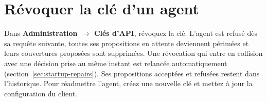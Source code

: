 \section{Révoquer la clé d'un agent}
\label{sec:agents-revoke}

Dans \textbf{Administration \(\rightarrow\) Clés d'API}, révoquez la
clé. L'agent est refusé dès sa requête suivante, toutes ses
propositions en attente deviennent périmées et leurs couvertures
proposées sont supprimées. Une révocation qui entre en collision avec
une décision prise au même instant est relancée automatiquement
(section~\ref{sec:startup-repairs}). Ses propositions acceptées et refusées
restent dans l'historique. Pour réadmettre l'agent, créez une nouvelle
clé et mettez à jour la configuration du client.

